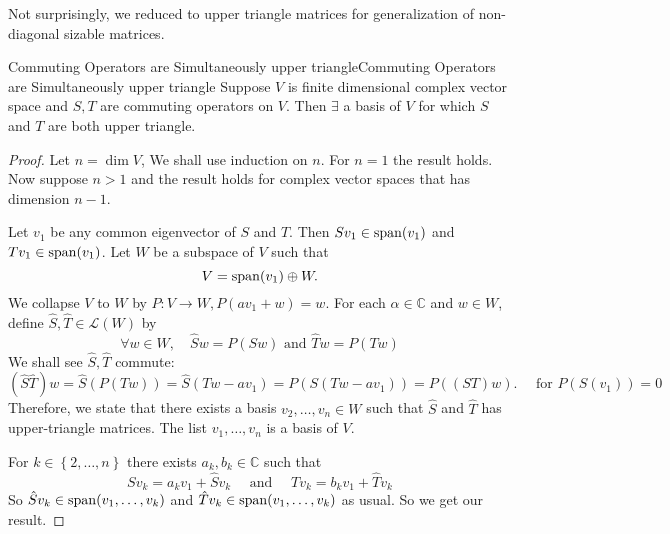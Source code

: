 \documentclass[../main.tex]{subfiles}
\begin{document}
Not surprisingly, we reduced to upper triangle matrices for generalization of non-diagonal sizable matrices.

\begin{theorem}{Commuting Operators are Simultaneously upper triangle}{Commuting Operators are Simultaneously upper triangle}
Suppose $V$ is finite dimensional complex vector space and $S,T$ are commuting operators on  $V$. Then $\exists $ a basis of $V$ for which $S$ and $T$ are both upper triangle.
\end{theorem}
\begin{proof}
Let $n=\dim V$, We shall use induction on $n$.  For $n=1$ the result holds. Now suppose $n>1$ and the result holds for complex vector spaces that has dimension $n-1$.

Let $v_1$ be any common eigenvector of $S$ and $T$. Then $Sv_1\in \operatorname{span} (v_1)$ and $Tv_1\in \operatorname{span} (v_1)$. Let $W$ be a subspace of  $V$ such that
\begin{equation*}
V = \operatorname{span} (v_1) \oplus W.
\end{equation*}
We collapse $V$ to $W$ by $P:V \rightarrow W, P(av_1+w) = w$. For each $\alpha\in \mathbb{C}$ and $w\in W$, define $\hat{S},\hat{T}\in \mathscr{L}(W)$ by
\begin{equation*}
\forall w\in W,\quad \hat{S}w = P(Sw) \text{ and } \hat{T}w = P(Tw)
\end{equation*}
We shall see $\hat{S},\hat{T}$ commute:
\begin{equation*}
	(\hat{S}\hat{T})w = \hat{S}(P(Tw)) = \hat{S}(Tw-av_1) = P(S(Tw-av_1)) = P((ST)w). \quad \text{ for } P(S(v_1)) =0
\end{equation*}
Therefore, we state that there exists a basis $v_2, \ldots ,v_n\in W$ such that $\hat{S}$ and $\hat{T}$ has upper-triangle matrices. The list $v_1, \ldots ,v_n$ is a basis of $V$.

For $k\in \left\{ 2, \ldots ,n \right\}$ there exists $a_k,b_k\in \mathbb{C}$ such that
\begin{equation*}
S v_k = a_k v_1+\hat{S} v_k \quad \text{ and }\quad T v_k = b_kv_1+\hat{T} v_k
\end{equation*}
So $\hat{S} v_k\in \operatorname{span} (v_1, \ldots ,v_k)$ and $\hat{T} v_k \in \operatorname{span} (v_1, \ldots ,v_k)$ as usual. So we get our result.
\end{proof}
\end{document}
